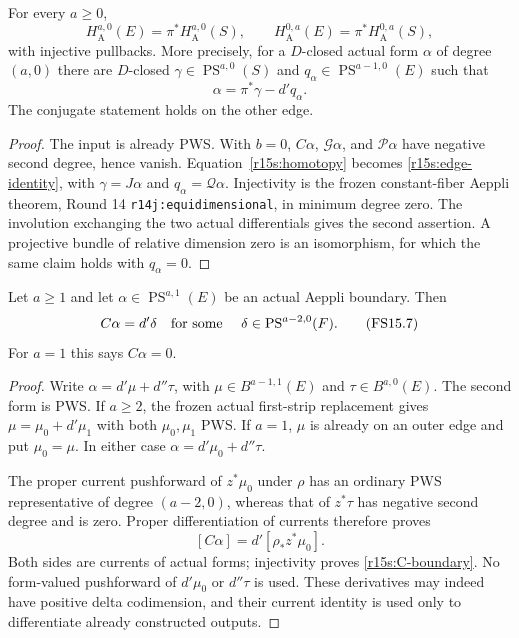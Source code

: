 \begin{theorem}
\label{r15s:edge}
For every $a\geq0$,
\[
 H_{\mathrm A}^{a,0}(E)=\pi^*H_{\mathrm A}^{a,0}(S),
 \qquad
 H_{\mathrm A}^{0,a}(E)=\pi^*H_{\mathrm A}^{0,a}(S),
\tag{FS15.5}\label{r15s:edge-formula}
\]
with injective pullbacks.  More precisely, for a $D$-closed
actual form $\alpha$ of degree $(a,0)$ there are $D$-closed
$\gamma\in\operatorname{PS}^{a,0}(S)$ and
$q_\alpha\in\operatorname{PS}^{a-1,0}(E)$ such that
\[
                    \alpha=\pi^*\gamma-d'q_\alpha.
\tag{FS15.6}\label{r15s:edge-identity}
\]
The conjugate statement holds on the other edge.
\end{theorem}

\begin{proof}
The input is already PWS.  With $b=0$,
$C\alpha$, $\mathcal G\alpha$, and $\mathcal P\alpha$
have negative second degree, hence vanish.
Equation~\eqref{r15s:homotopy} becomes
\eqref{r15s:edge-identity}, with $\gamma=J\alpha$ and
$q_\alpha=\mathcal Q\alpha$.
Injectivity is the frozen constant-fiber Aeppli theorem,
Round 14 \texttt{r14j:equidimensional}, in minimum degree
zero.  The involution exchanging the two actual differentials
gives the second assertion.  A projective bundle of relative
dimension zero is an isomorphism, for which the same claim
holds with $q_\alpha=0$.
\end{proof}

\begin{lemma}
\label{r15s:C-boundaries}
Let $a\geq1$ and let
$\alpha\in\operatorname{PS}^{a,1}(E)$ be an actual
Aeppli boundary.  Then
\[
           C\alpha=d'\delta
           \quad\hbox{for some }\quad
           \delta\in\operatorname{PS}^{a-2,0}(F).
\tag{FS15.7}\label{r15s:C-boundary}
\]
For $a=1$ this says $C\alpha=0$.
\end{lemma}

\begin{proof}
Write $\alpha=d'\mu+d''\tau$, with
$\mu\in B^{a-1,1}(E)$ and $\tau\in B^{a,0}(E)$.
The second form is PWS.  If $a\geq2$, the frozen actual
first-strip replacement gives
$\mu=\mu_0+d'\mu_1$ with both $\mu_0,\mu_1$ PWS.
If $a=1$, $\mu$ is already on an outer edge and put
$\mu_0=\mu$.  In either case
$\alpha=d'\mu_0+d''\tau$.

The proper current pushforward of $z^*\mu_0$ under
$\rho$ has an ordinary PWS representative of degree
$(a-2,0)$, whereas that of $z^*\tau$ has negative second
degree and is zero.  Proper differentiation of currents
therefore proves
\[
        [C\alpha]=d'[\rho_*z^*\mu_0].
\]
Both sides are currents of actual forms; injectivity proves
\eqref{r15s:C-boundary}.  No form-valued pushforward of
$d'\mu_0$ or $d''\tau$ is used.  These derivatives may
indeed have positive delta codimension, and their current
identity is used only to differentiate already constructed
outputs.
\end{proof}

